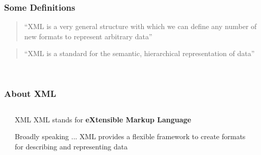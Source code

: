 \documentclass{beamer}\usepackage[]{graphicx}\usepackage[]{color}
\begin{document}

\begin{frame}
\frametitle{Some Definitions}

\begin{quotation}
``XML is a very general structure with which we can define any number of new formats to represent arbitrary data''
\end{quotation}

\begin{quotation}
``XML is a standard for the semantic, hierarchical representation of data''
\end{quotation}

{\footnotesize 
\hspace{8mm}  \\
\hspace{8mm} 
}

\end{frame}


\begin{frame}
\frametitle{About XML}

\begin{columns}[t]
\begin{column}{0.1\textwidth}
\end{column}
\begin{column}{0.8\textwidth}
 
\begin{block}{XML}
XML stands for \textbf{eXtensible Markup Language}
\end{block}

\begin{block}{Broadly speaking ...}
XML provides a flexible framework to create formats for describing and representing data
\end{block}

\end{column}
\begin{column}{0.1\textwidth}
\end{column}
\end{columns}

\end{frame}

\end{document}
